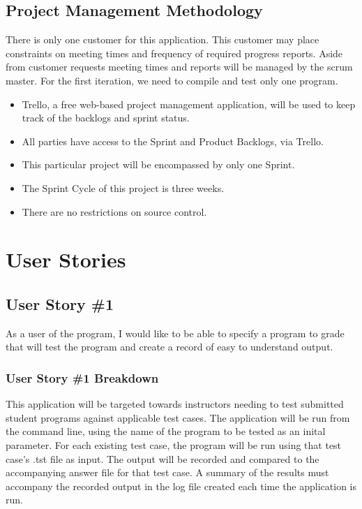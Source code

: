 \subsection{Project  Management Methodology}
There is only one customer for this application. This customer may place constraints
on meeting times and frequency of required progress reports. Aside from customer
requests meeting times and reports will be managed by the scrum master.
For the first iteration, we need to compile and test only one program. 

\begin{itemize}
\item Trello, a free web-based project management application, will be used to keep
         track of the backlogs and sprint status.
\item All parties have access to the Sprint and Product Backlogs, via Trello.
\item This particular project will be encompassed by only one Sprint.
\item The Sprint Cycle of this project is three weeks.
\item There are no restrictions on source control.
\end{itemize}

\section{User Stories}


\subsection{User Story \#1}
As a user of the program, I would like to be able to specify a program to grade that will test the program and create a record of easy to understand output.

\subsubsection{User Story \#1 Breakdown}
This application will be targeted towards instructors needing to test submitted student programs against applicable test
cases.  The application will be run from the command line, using the name of the program to be tested as an inital parameter.
For each existing test case, the program will be run using that test case's .tst file as input.  The output will be recorded and 
compared to the accompanying answer file for that test case.  A summary of the results must accompany the recorded
output in the log file created each time the application is run.


